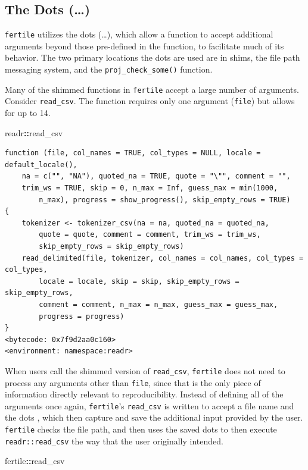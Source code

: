 \documentclass[12pt,twoside]{reedthesis}
\newenvironment{Shaded}{\begin{snugshade}}{\end{snugshade}}
\newcommand{\OperatorTok}[1]{\textcolor[rgb]{0.81,0.36,0.00}{\textbf{#1}}}
\newcommand{\NormalTok}[1]{#1}
\begin{document}
\subsection{The Dots (\ldots{})}\label{the-dots}

\texttt{fertile} utilizes the dots (\ldots{}), which allow a function to
accept additional arguments beyond those pre-defined in the function, to
facilitate much of its behavior. The two primary locations the dots are
used are in shims, the file path messaging system, and the
\texttt{proj\_check\_some()} function.

Many of the shimmed functions in \texttt{fertile} accept a large number
of arguments. Consider \texttt{read\_csv}. The function requires only
one argument (\texttt{file}) but allows for up to 14.
\begin{Shaded}
\begin{Highlighting}[]
\NormalTok{readr}\OperatorTok{::}\NormalTok{read_csv}
\end{Highlighting}
\end{Shaded}
\begin{verbatim}
function (file, col_names = TRUE, col_types = NULL, locale = default_locale(), 
    na = c("", "NA"), quoted_na = TRUE, quote = "\"", comment = "", 
    trim_ws = TRUE, skip = 0, n_max = Inf, guess_max = min(1000, 
        n_max), progress = show_progress(), skip_empty_rows = TRUE) 
{
    tokenizer <- tokenizer_csv(na = na, quoted_na = quoted_na, 
        quote = quote, comment = comment, trim_ws = trim_ws, 
        skip_empty_rows = skip_empty_rows)
    read_delimited(file, tokenizer, col_names = col_names, col_types = col_types, 
        locale = locale, skip = skip, skip_empty_rows = skip_empty_rows, 
        comment = comment, n_max = n_max, guess_max = guess_max, 
        progress = progress)
}
<bytecode: 0x7f9d2aa0c160>
<environment: namespace:readr>
\end{verbatim}
When users call the shimmed version of \texttt{read\_csv},
\texttt{fertile} does not need to process any arguments other than
\texttt{file}, since that is the only piece of information directly
relevant to reproducibility. Instead of defining all of the arguments
once again, \texttt{fertile}'s \texttt{read\_csv} is written to accept a
file name and the dots , which then capture and save the additional
input provided by the user. \texttt{fertile} checks the file path, and
then uses the saved dots to then execute \texttt{readr::read\_csv} the
way that the user originally intended.
\begin{Shaded}
\begin{Highlighting}[]
\NormalTok{fertile}\OperatorTok{::}\NormalTok{read_csv}
\end{Highlighting}
\end{Shaded}
\end{document}
